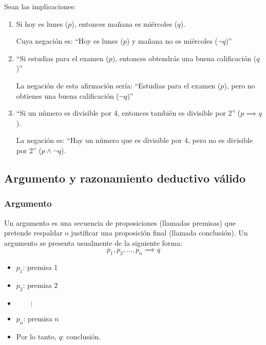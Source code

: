 \begin{fmd-example}
	Sean las implicaciones:
	
	\begin{enumerate}[label=\roman*)]
		\item Si hoy es lunes ($p$), entonces mañana es miércoles ($q$).
		
		Cuya negación es: ``Hoy es lunes ($p$) y mañana no es miércoles ($\neg q$)''
		
		\item ``Si estudias para el examen ($p$), entonces obtendrás una buena calificación ($q$)''
		
		La negación de esta afirmación sería: ``Estudias para el examen ($p$), pero no obtienes una buena calificación ($\neg q$)''
		
		\item ``Si un número es divisible por 4, entonces también es divisible por 2'' ($p \implies q$).
		
		La negación es: ``Hay un número que es divisible por 4, pero no es divisible por 2'' ($ p \land \neg q$).
	\end{enumerate}
\end{fmd-example}

\subsection{Argumento y razonamiento deductivo válido}

\subsubsection{Argumento} 
\begin{fmd-definition}[Argumento]
	Un \gls{argumento} es una secuencia de proposiciones (llamadas premisas) que pretende respaldar o justificar una proposición final (llamada conclusión). Un argumento se presenta usualmente de la siguiente forma:
	\[ p_1, p_2, \dots, p_n \implies q \]
	
	\begin{itemize}[itemsep=-3pt]
		\item $p_1$: premisa 1
		\item $p_2$: premisa 2
		\item $\qquad \vdots$
		\item $p_n$: premisa $n$
		\item Por lo tanto, $q$: conclusión.
	\end{itemize}
\end{fmd-definition}

